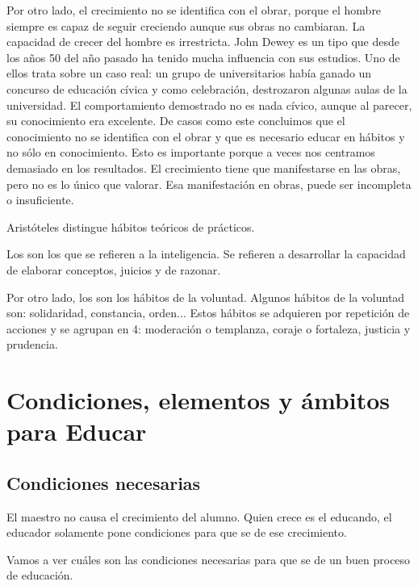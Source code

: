 \documentclass[palatino]{apuntesURJC}
\begin{document}
Por otro lado, el crecimiento no se identifica con el obrar, porque el hombre siempre es capaz de seguir creciendo aunque sus obras no cambiaran. 
%
La capacidad de crecer del hombre es irrestricta.\label{Capacidad_irrestricta}
%
John Dewey es un tipo que desde los años 50 del año pasado ha tenido mucha influencia con sus estudios.
%
Uno de ellos trata sobre un caso real: un grupo de universitarios había ganado un concurso de educación cívica y como celebración, destrozaron algunas aulas de la universidad.
% 
El comportamiento demostrado no es nada cívico, aunque al parecer, su conocimiento era excelente.
%
De casos como este concluimos que el conocimiento no se identifica con el obrar y que es necesario educar en hábitos y no sólo en conocimiento.
%
Esto es importante porque a veces nos centramos demasiado en los resultados.
%
El crecimiento tiene que manifestarse en las obras, pero no es lo único que valorar. Esa manifestación en obras, puede ser incompleta o insuficiente.


Aristóteles distingue hábitos teóricos de prácticos.

Los   son los que se refieren a la inteligencia. Se refieren a  desarrollar la capacidad de elaborar conceptos, juicios y de razonar. 

Por otro lado, los  son los hábitos de la voluntad.
%
Algunos hábitos de la voluntad son: solidaridad, constancia, orden... 
%
Estos hábitos se adquieren por repetición de acciones y se agrupan en 4: moderación o templanza, coraje o fortaleza, justicia y prudencia.





\chapter{Condiciones, elementos y ámbitos para Educar}

\section{Condiciones necesarias}

El maestro no causa el crecimiento del alumno. Quien crece es el educando, el educador solamente pone condiciones para que se de ese crecimiento.

Vamos a ver cuáles son las condiciones necesarias para que se de un buen proceso de educación.
\end{document}

